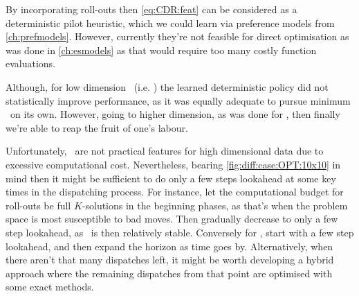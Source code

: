 By incorporating roll-outs then \cref{eq:CDR:feat} can be considered as a 
deterministic pilot heuristic, which we could learn via preference models from 
\cref{ch:prefmodels}. However, currently they're not feasible for direct 
optimisation as was done in \cref{ch:esmodels} as that would require too many 
costly function evaluations.

Although, for low dimension \jsp\ (i.e. \Problem[6\times5]{\train}) the learned 
deterministic policy did not statistically improve performance, as it was 
equally adequate to pursue minimum \phiRNDmin\ on its own.
However, going to higher dimension, as was done for , then finally 
we're able to reap the fruit of one's labour.

Unfortunately, \phiRNDRelated\ are not practical features for high dimensional 
data due to excessive computational cost. 
Nevertheless, bearing \cref{fig:diff:case:OPT:10x10} in mind then it 
might be sufficient to do only a few steps lookahead at some key times in the 
dispatching process. For instance, let the computational budget for 
 roll-outs be full $K$-solutions in the beginning phases, as 
that's when the problem space is most susceptible to bad moves. Then gradually 
decrease to only a few step lookahead, as \fsp\ is then relatively stable.
Conversely for , start with a few step lookahead, and then 
expand the horizon as time goes by. Alternatively, when there aren't that many 
dispatches left, it might be worth developing a hybrid approach where the 
remaining dispatches from that point are optimised with some exact methods. 

